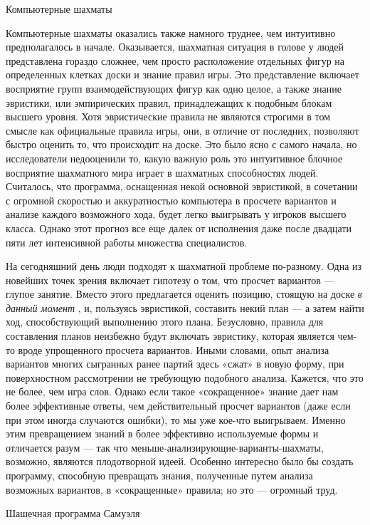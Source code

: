 Компьютерные шахматы

Компьютерные шахматы оказались также намного труднее, чем интуитивно предполагалось в начале. Оказывается, шахматная ситуация в голове у людей представлена гораздо сложнее, чем просто расположение отдельных фигур на определенных клетках доски и знание правил игры. Это представление включает восприятие групп взаимодействующих фигур как одно целое, а также знание эвристики, или эмпирических правил, принадлежащих к подобным блокам высшего уровня. Хотя эвристические правила не являются строгими в том смысле как официальные правила игры, они, в отличие от последних, позволяют быстро оценить то, что происходит на доске. Это было ясно с самого начала, но исследователи недооценили то, какую важную роль это интуитивное блочное восприятие шахматного мира играет в шахматных способностях людей. Считалось, что программа, оснащенная некой основной эвристикой, в сочетании с огромной скоростью и аккуратностью компьютера в просчете вариантов и анализе каждого возможного хода, будет легко выигрывать у игроков высшего класса. Однако этот прогноз все еще далек от исполнения даже после двадцати пяти лет интенсивной работы множества специалистов.

На сегодняшний день люди подходят к шахматной проблеме по-разному. Одна из новейших точек зрения включает гипотезу о том, что просчет вариантов --- глупое занятие. Вместо этого предлагается оценить позицию, стоящую на доске \emph{в данный момент} , и, пользуясь эвристикой, составить некий план --- а затем найти ход, способствующий выполнению этого плана. Безусловно, правила для составления планов неизбежно будут включать эвристику, которая является чем-то вроде упрощенного просчета вариантов. Иными словами, опыт анализа вариантов многих сыгранных ранее партий здесь «сжат» в новую форму, при поверхностном рассмотрении не требующую подобного анализа. Кажется, что это не более, чем игра слов. Однако если такое «сокращенное» знание дает нам более эффективные ответы, чем действительный просчет вариантов (даже если при этом иногда случаются ошибки), то мы уже кое-что выигрываем. Именно этим превращением знаний в более эффективно используемые формы и отличается разум --- так что меньше-анализирующие-варианты-шахматы, возможно, являются плодотворной идеей. Особенно интересно было бы создать программу, способную превращать знания, полученные путем анализа возможных вариантов, в «сокращенные» правила; но это --- огромный труд.

Шашечная программа Самуэля

